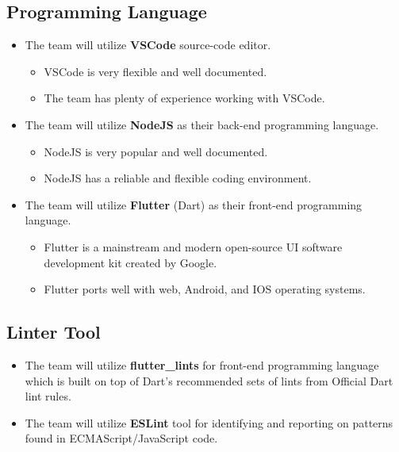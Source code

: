 \documentclass{article}
\begin{document}
\subsection{Programming Language}
    \begin{itemize}
        \item The team will utilize \textbf{VSCode} source-code editor.
        \begin{itemize}
            \item VSCode is very flexible and well documented.
            \item The team has plenty of experience working with VSCode.
        \end{itemize}
        \item The team will utilize \textbf{NodeJS} as their back-end programming language.
        \begin{itemize}
            \item NodeJS is very popular and well documented.
            \item NodeJS has a reliable and flexible coding environment.
        \end{itemize}
        \item The team will utilize \textbf{Flutter} (Dart) as their front-end programming language.
        \begin{itemize}
            \item Flutter is a mainstream and modern open-source UI software development kit created by Google.
            \item Flutter ports well with web, Android, and IOS operating systems.
        \end{itemize}
    \end{itemize}
\subsection{Linter Tool}
    \begin{itemize}
        \item The team will utilize \textbf{flutter\_lints} for front-end programming language which is built on top of Dart's recommended sets of lints from Official Dart lint rules.
        \item The team will utilize \textbf{ESLint} tool for identifying and reporting on patterns found in ECMAScript/JavaScript code.
    \end{itemize}
\end{document}
